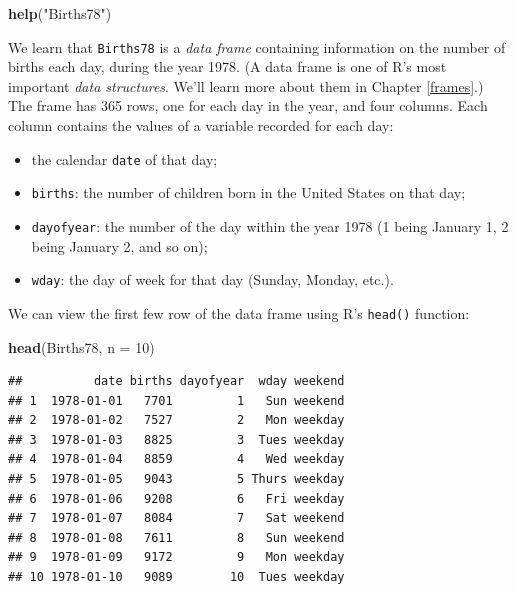 \documentclass[]{book}
\makeatletter
\newenvironment{Shaded}{\begin{snugshade}}{\end{snugshade}}
\newcommand{\KeywordTok}[1]{\textcolor[rgb]{0.13,0.29,0.53}{\textbf{{#1}}}}
\newcommand{\DataTypeTok}[1]{\textcolor[rgb]{0.13,0.29,0.53}{{#1}}}
\newcommand{\DecValTok}[1]{\textcolor[rgb]{0.00,0.00,0.81}{{#1}}}
\newcommand{\StringTok}[1]{\textcolor[rgb]{0.31,0.60,0.02}{{#1}}}
\newcommand{\NormalTok}[1]{{#1}}
\providecommand{\tightlist}{%
  \setlength{\itemsep}{0pt}\setlength{\parskip}{0pt}}
\newenvironment{kframe}{%
\medskip{}
\setlength{\fboxsep}{.8em}
 \def\at@end@of@kframe{}%
 \ifinner\ifhmode%
  \def\at@end@of@kframe{\end{minipage}}%
  \begin{minipage}{\columnwidth}%
 \fi\fi%
 \def\FrameCommand##1{\hskip\@totalleftmargin \hskip-\fboxsep
 \colorbox{shadecolor}{##1}\hskip-\fboxsep
     \hskip-\linewidth \hskip-\@totalleftmargin \hskip\columnwidth}%
 \MakeFramed {\advance\hsize-\width
   \@totalleftmargin\z@ \linewidth\hsize
   \@setminipage}}%
 {\par\unskip\endMakeFramed%
 \at@end@of@kframe}
\renewenvironment{Shaded}{\begin{kframe}}{\end{kframe}}
\theoremstyle{definition}
\theoremstyle{definition}
\theoremstyle{remark}
\makeatother
\begin{document}
\begin{Shaded}
\begin{Highlighting}[]
\KeywordTok{help}\NormalTok{(}\StringTok{"Births78"}\NormalTok{)}
\end{Highlighting}
\end{Shaded}

We learn that \texttt{Births78} is a \emph{data frame} containing
information on the number of births each day, during the year 1978. (A
data frame is one of R's most important \emph{data structures}. We'll
learn more about them in Chapter \ref{frames}.) The frame has 365 rows,
one for each day in the year, and four columns. Each column contains the
values of a variable recorded for each day:

\begin{itemize}
\tightlist
\item
  the calendar \texttt{date} of that day;
\item
  \texttt{births}: the number of children born in the United States on
  that day;
\item
  \texttt{dayofyear}: the number of the day within the year 1978 (1
  being January 1, 2 being January 2, and so on);
\item
  \texttt{wday}: the day of week for that day (Sunday, Monday, etc.).
\end{itemize}

We can view the first few row of the data frame using R's
\texttt{head()} function:

\begin{Shaded}
\begin{Highlighting}[]
\KeywordTok{head}\NormalTok{(Births78, }\DataTypeTok{n =} \DecValTok{10}\NormalTok{)}
\end{Highlighting}
\end{Shaded}

\begin{verbatim}
##          date births dayofyear  wday weekend
## 1  1978-01-01   7701         1   Sun weekend
## 2  1978-01-02   7527         2   Mon weekday
## 3  1978-01-03   8825         3  Tues weekday
## 4  1978-01-04   8859         4   Wed weekday
## 5  1978-01-05   9043         5 Thurs weekday
## 6  1978-01-06   9208         6   Fri weekday
## 7  1978-01-07   8084         7   Sat weekend
## 8  1978-01-08   7611         8   Sun weekend
## 9  1978-01-09   9172         9   Mon weekday
## 10 1978-01-10   9089        10  Tues weekday
\end{verbatim}
\end{document}
